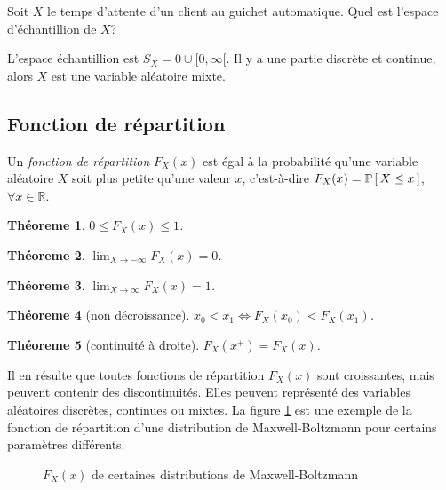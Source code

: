 \documentclass[11pt]{article}
\renewcommand\P[1]{%
	\ensuremath{%
		\mathbb{P}\left[\,#1\,\right]%
	}%
}%
\newtheorem{theoreme}{Théoreme}[section]
\begin{document}
\begin{exemple}
	Soit $X$ le temps d'attente d'un client au guichet automatique. Quel est
	l'espace d'échantillion de $X$?

	L'espace échantillion est $S_X={0}\cup [0,\infty[$. Il y a une partie
	discrète et continue, alors $X$ est une variable aléatoire mixte.
\end{exemple}

\subsection{Fonction de répartition}
\begin{definition}
	Un \textit{fonction de répartition} $F_X(x)$ est égal à la probabilité
	qu'une variable aléatoire $X$ soit plus petite qu'une valeur $x$,
	c'est-à-dire $F_X(x)=\P{X\leq x}$, $\forall x\in\mathbb{R}$.
\end{definition}

\begin{theoreme}
	$0\leq F_X(x)\leq 1$.
\end{theoreme}

\begin{theoreme}
	$\displaystyle\lim_{X\rightarrow-\infty}F_X(x)=0$.
\end{theoreme}

\begin{theoreme}
	$\displaystyle\lim_{X\rightarrow \infty}F_X(x)=1$.
\end{theoreme}

\begin{theoreme}[non décroissance]
	$x_0<x_1\Leftrightarrow F_X(x_0)<F_X(x_1)$.
\end{theoreme}

\begin{theoreme}[continuité à droite]
	$F_X(x^+)=F_X(x)$.
\end{theoreme}

Il en résulte que toutes fonctions de répartition $F_X(x)$ sont croissantes,
mais peuvent contenir des discontinuités. Elles peuvent représenté des
variables aléatoires discrètes, continues ou mixtes. La figure
\ref{fig:maxwell} est une exemple de la fonction de répartition d'une
distribution de Maxwell-Boltzmann pour certains paramètres différents.

\begin{figure}[H]
	\centering
	\caption{$F_X(x)$ de certaines distributions de Maxwell-Boltzmann}
	
	\label{fig:maxwell}
\end{figure}
\end{document}
